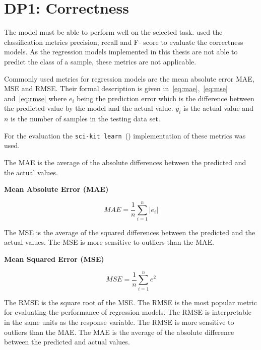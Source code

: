 \section{DP1: Correctness}\label{sec:dp1:-correctness}

The model must be able to perform well on the selected task.
\cite{siebert2022construction} used the classification metrics precision, recall and F-
score to evaluate the correctness models.
As the regression models implemented in this thesis are not able to predict
the class of a sample, these metrics are not applicable.

Commonly used metrics for regression models are the mean absolute error \ac{MAE},
\ac{MSE} and \ac{RMSE}.
Their formal description is given in~\ref{eq:mae},~\ref{eq:mse} and~\ref{eq:rmse} where
\(e_i\) being the prediction error which is the difference between the predicted value
by the model and the actual value.
\(y_i\) is the actual value and \(n\) is the number of samples in the testing data set.

For the evaluation the \texttt{sci-kit learn}~(\cite{scikit-learn}) implementation of
these metrics was used.

The MAE is the average of the absolute differences between the predicted and the
actual values.

\textbf{Mean Absolute Error (MAE)}

\begin{tcolorbox}[arc=0pt,boxrule=0.5pt]
    \begin{equation}
        MAE = \frac{1}{n} \sum_{i=1}^{n} |e_i|
        \label{eq:mae}
    \end{equation}
\end{tcolorbox}

The MSE is the average of the squared differences between the predicted and
the actual values.
The MSE is more sensitive to outliers than the MAE.

\textbf{Mean Squared Error (MSE)}

\begin{tcolorbox}[arc=0pt,boxrule=0.5pt]
    \begin{equation}
        \label{eq:mse}
        MSE = \frac{1}{n} \sum_{i=1}^{n} e^2
    \end{equation}
\end{tcolorbox}

The RMSE is the square root of the MSE. The RMSE is the most popular metric
for evaluating the performance of regression models.
The RMSE is interpretable in the same units as the response variable.
The RMSE is more sensitive to outliers than the MAE.
The MAE is the average of the absolute difference between the predicted and actual values.

